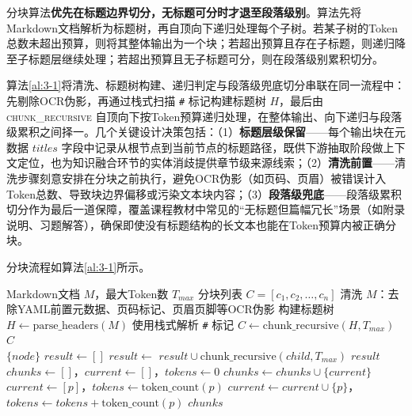 分块算法\textbf{优先在标题边界切分，无标题可分时才退至段落级别}。算法先将Markdown文档解析为标题树，再自顶向下递归处理每个子树。若某子树的Token总数未超出预算，则将其整体输出为一个块；若超出预算且存在子标题，则递归降至子标题层继续处理；若超出预算且无子标题可分，则在段落级别累积切分。

算法\ref{al:3-1}将清洗、标题树构建、递归判定与段落级兜底切分串联在同一流程中：先剔除OCR伪影，再通过栈式扫描 \texttt{\#} 标记构建标题树 $H$，最后由 \textsc{chunk\_recursive} 自顶向下按Token预算递归处理，在整体输出、向下递归与段落级累积之间择一。几个关键设计决策包括：（1）\textbf{标题层级保留}——每个输出块在元数据 $titles$ 字段中记录从根节点到当前节点的标题路径，既供下游抽取阶段做上下文定位，也为知识融合环节的实体消歧提供章节级来源线索；（2）\textbf{清洗前置}——清洗步骤刻意安排在分块之前执行，避免OCR伪影（如页码、页眉）被错误计入Token总数、导致块边界偏移或污染文本块内容；（3）\textbf{段落级兜底}——段落级累积切分作为最后一道保障，覆盖课程教材中常见的“无标题但篇幅冗长”场景（如附录说明、习题解答），确保即使没有标题结构的长文本也能在Token预算内被正确分块。

分块流程如算法\ref{al:3-1}所示。

\begin{algorithm}[H]
    \caption{递归标题感知分块算法}\label{al:3-1}
    \begin{algorithmic}[1]
        \Require Markdown文档 $M$，最大Token数 $T_{max}$
        \Ensure 分块列表 $C = [c_1, c_2, \ldots, c_n]$
        \State 清洗 $M$：去除YAML前置元数据、页码标记、页眉页脚等OCR伪影
        \State 构建标题树 $H \gets \text{parse\_headers}(M)$
        \Statex \hspace{2em} 使用栈式解析 \texttt{\#} 标记
        \State $C \gets \text{chunk\_recursive}(H, T_{max})$
        \State \Return $C$
        \\
                \State \Return $\{node\}$ 
                \State $result \gets []$
                    \State $result \gets$
                    \Statex \hspace{3em} $result \cup \text{chunk\_recursive}(child, T_{max})$
                \EndFor
                \State \Return $result$
            \Else
                \State $chunks \gets []$，$current \gets []$，$tokens \gets 0$
                        \State $chunks \gets chunks \cup \{current\}$
                        \State $current \gets [p]$，$tokens \gets \text{token\_count}(p)$
                    \Else
                        \State $current \gets current \cup \{p\}$，$tokens \gets tokens + \text{token\_count}(p)$
                    \EndIf
                \EndFor
                \State \Return $chunks$
            \EndIf
        \EndFunction
    \end{algorithmic}
\end{algorithm}

